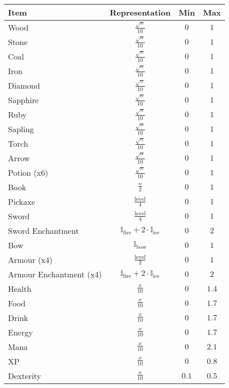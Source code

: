 \documentclass{article}
\theoremstyle{plain}
\theoremstyle{definition}
\theoremstyle{remark}
\begin{document}
\begin{table*}[t]
\centering
\begin{tabular}{@{}l c c c@{}} 
    \toprule
    \textbf{Item} & \textbf{Representation} & \textbf{Min} & \textbf{Max} \\
    \midrule
    Wood & $\frac{\sqrt{n}}{10}$ & $0$ & $1$ \\
    Stone & $\frac{\sqrt{n}}{10}$ & $0$ & $1$ \\
    Coal & $\frac{\sqrt{n}}{10}$ & $0$ & $1$ \\
    Iron & $\frac{\sqrt{n}}{10}$ & $0$ & $1$ \\
    Diamond & $\frac{\sqrt{n}}{10}$ & $0$ & $1$ \\
    Sapphire & $\frac{\sqrt{n}}{10}$ & $0$ & $1$ \\
    Ruby & $\frac{\sqrt{n}}{10}$ & $0$ & $1$ \\
    Sapling & $\frac{\sqrt{n}}{10}$ & $0$ & $1$ \\
    Torch & $\frac{\sqrt{n}}{10}$ & $0$ & $1$ \\
    Arrow & $\frac{\sqrt{n}}{10}$ & $0$ & $1$ \\
    Potion (x6) & $\frac{\sqrt{n}}{10}$ & $0$ & $1$ \\
    Book & $\frac{n}{2}$ & $0$ & $1$ \\
    Pickaxe & $\frac{\text{level}}{4}$ & $0$ & $1$ \\
    Sword & $\frac{\text{level}}{4}$ & $0$ & $1$ \\
    Sword Enchantment & $\mathbb{I}_{\text{fire}} + 2 \cdot \mathbb{I}_{\text{ice}} $ & $0$ & $2$ \\
    Bow & $\mathbb{I}_{\text{bow}} $ & $0$ & $1$ \\
    Armour (x4) & $\frac{\text{level}}{2}$ & $0$ & $1$ \\
    Armour Enchantment (x4) & $\mathbb{I}_{\text{fire}} + 2 \cdot \mathbb{I}_{\text{ice}} $ & $0$ & $2$ \\
    Health & $\frac{x}{10}$ & $0$ & $1.4$ \\
    Food & $\frac{x}{10}$ & $0$ & $1.7$ \\
    Drink & $\frac{x}{10}$ & $0$ & $1.7$ \\
    Energy & $\frac{x}{10}$ & $0$ & $1.7$ \\
    Mana & $\frac{x}{10}$ & $0$ & $2.1$ \\
    XP & $\frac{x}{10}$ & $0$ & $0.8$ \\
    Dexterity & $\frac{x}{10}$ & $0.1$ & $0.5$ \\

\end{tabular}
\end{table*}
\end{document}
